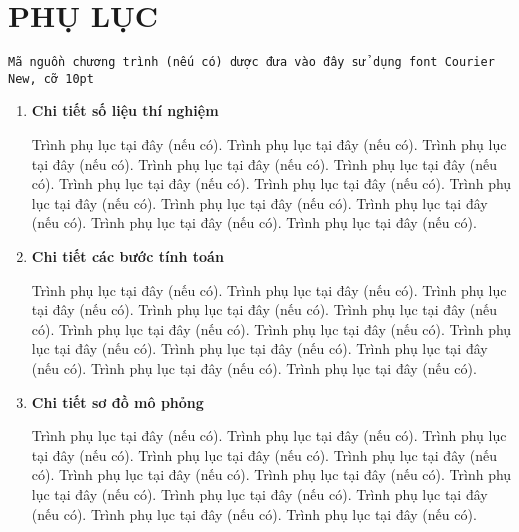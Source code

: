 \section*{\centering PHỤ LỤC}


\texttt{\fontsize{10pt}{0pt}\selectfont Mã nguồn chương trình (nếu có) dược đưa vào đây sử dụng font Courier New, cỡ 10pt}

\begin{enumerate}[label=\textbf{A\arabic*.}]
  
    \item  \textbf{Chi tiết số liệu thí nghiệm}
    
    Trình phụ lục tại đây (nếu có). Trình phụ lục tại đây (nếu có). Trình phụ lục tại đây (nếu có). Trình phụ lục tại đây (nếu có). Trình phụ lục tại đây (nếu có). Trình phụ lục tại đây (nếu có). Trình phụ lục tại đây (nếu có). Trình phụ lục tại đây (nếu có). Trình phụ lục tại đây (nếu có). Trình phụ lục tại đây (nếu có). Trình phụ lục tại đây (nếu có). Trình phụ lục tại đây (nếu có).
    \item  \textbf{Chi tiết các bước tính toán}
    
    Trình phụ lục tại đây (nếu có). Trình phụ lục tại đây (nếu có). Trình phụ lục tại đây (nếu có). Trình phụ lục tại đây (nếu có). Trình phụ lục tại đây (nếu có). Trình phụ lục tại đây (nếu có). Trình phụ lục tại đây (nếu có). Trình phụ lục tại đây (nếu có). Trình phụ lục tại đây (nếu có). Trình phụ lục tại đây (nếu có). Trình phụ lục tại đây (nếu có). Trình phụ lục tại đây (nếu có).
    \item  \textbf{Chi tiết sơ đồ mô phỏng}
    
    Trình phụ lục tại đây (nếu có). Trình phụ lục tại đây (nếu có). Trình phụ lục tại đây (nếu có). Trình phụ lục tại đây (nếu có). Trình phụ lục tại đây (nếu có). Trình phụ lục tại đây (nếu có). Trình phụ lục tại đây (nếu có). Trình phụ lục tại đây (nếu có). Trình phụ lục tại đây (nếu có). Trình phụ lục tại đây (nếu có). Trình phụ lục tại đây (nếu có). Trình phụ lục tại đây (nếu có).
    
\end{enumerate}